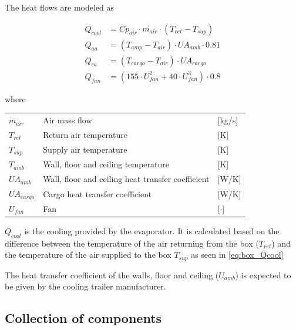 The heat flows are modeled as

\begin{align}
	Q_{cool} & = Cp_{air} \cdot \dot{m_{air}} \cdot (T_{ret} - T_{sup}) \label{eq:box_Qcool}  \\
	Q_{aa}   & = (T_{amp} - T_{air}) \cdot U A_{amb} \cdot 0.81 \label{eq:box_hf_wall-to-air} \\
	Q_{ca}   & = (T_{cargo} - T_{air}) \cdot U A_{cargo}                                      \\
	Q_{fan}  & = (155 \cdot U_{fan}^2 + 40 \cdot U_{fan}^3) \cdot 0.8
\end{align}

where
\begin{center}
	\begin{tabular}{l p{8cm} l}
		$\dot{m}_{air}$ & Air mass flow                                     & [\si{kg}/{\si{s}}] \\
		$T_{ret}$       & Return air temperature                            & [\si{K}]           \\
		$T_{sup}$       & Supply air temperature                            & [\si{K}]           \\
		$T_{amb}$       & Wall, floor and ceiling temperature               & [\si{K}]           \\
		$U A_{amb}$     & Wall, floor and ceiling heat transfer coefficient & [\si{W}/\si{K}]    \\
		$U A_{cargo}$   & Cargo heat transfer coefficient                   & [\si{W}/\si{K}]    \\
		$U_{fan}$       & Fan                                               & [$\cdot$]
	\end{tabular}
\end{center}

$Q_{cool}$ is the cooling provided by the evaporator. It is calculated based on the difference between the temperature of the air returning from the box ($T_{ret}$) and the temperature of the air supplied to the box $T_{sup}$ as seen in \cref{eq:box_Qcool}

The heat transfer coefficient of the walls, floor and ceiling  ($ U_{amb} $) is expected to be given by the cooling trailer manufacturer.



\clearpage
\subsection{Collection of components}

